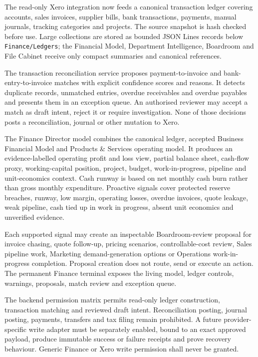The read-only Xero integration now feeds a canonical transaction ledger covering accounts,
sales invoices, supplier bills, bank transactions, payments, manual journals, tracking
categories and projects.  The source snapshot is hash checked before use.  Large collections
are stored as bounded JSON Lines records below \texttt{Finance/Ledgers}; the Financial Model,
Department Intelligence, Boardroom and File Cabinet receive only compact summaries and
canonical references.

The transaction reconciliation service proposes payment-to-invoice and bank-entry-to-invoice
matches with explicit confidence scores and reasons.  It detects duplicate records, unmatched
entries, overdue receivables and overdue payables and presents them in an exception queue.  An
authorised reviewer may accept a match as draft intent, reject it or require investigation.
None of those decisions posts a reconciliation, journal or other mutation to Xero.

The Finance Director model combines the canonical ledger, accepted Business Financial Model
and Products \& Services operating model.  It produces an evidence-labelled operating profit
and loss view, partial balance sheet, cash-flow proxy, working-capital position, project,
budget, work-in-progress, pipeline and unit-economics context.  Cash runway is based on net
monthly cash burn rather than gross monthly expenditure.  Proactive signals cover protected
reserve breaches, runway, low margin, operating losses, overdue invoices, quote leakage, weak
pipeline, cash tied up in work in progress, absent unit economics and unverified evidence.

Each supported signal may create an inspectable Boardroom-review proposal for invoice chasing,
quote follow-up, pricing scenarios, controllable-cost review, Sales pipeline work, Marketing
demand-generation options or Operations work-in-progress completion.  Proposal creation does
not route, send or execute an action.  The permanent Finance terminal exposes the living model,
ledger controls, warnings, proposals, match review and exception queue.

The backend permission matrix permits read-only ledger construction, transaction matching and
reviewed draft intent.  Reconciliation posting, journal posting, payments, transfers and tax
filing remain prohibited.  A future provider-specific write adapter must be separately enabled,
bound to an exact approved payload, produce immutable success or failure receipts and prove
recovery behaviour.  Generic Finance or Xero write permission shall never be granted.

